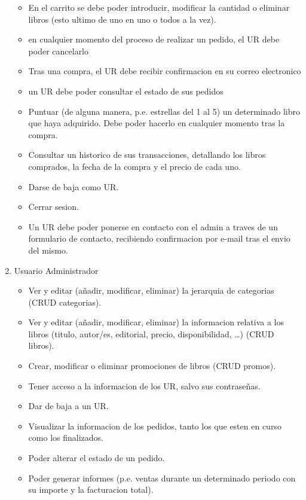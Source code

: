 \documentclass[a4paper]{report}
\begin{document}
\begin{enumerate}
\begin{itemize}
                    \item En el carrito se debe poder introducir, modificar la cantidad o eliminar libros (esto ultimo de uno en uno o todos a la vez).
                    \item en cualquier momento del proceso de realizar un pedido, el UR debe poder cancelarlo
                    \item Tras una compra, el UR debe recibir confirmacion en su correo electronico
                    \item un UR debe poder consultar el estado de sus pedidos
                    \item Puntuar (de alguna manera, p.e. estrellas del 1 al 5) un determinado libro que haya adquirido. Debe poder hacerlo en cualquier momento tras la compra.
                    \item Consultar un historico de sus transacciones, detallando los libros comprados, la fecha de la compra y el precio de cada uno.
                    \item Darse de baja como UR.
                    \item Cerrar sesion.
                    \item Un UR debe poder ponerse en contacto con el admin a traves de un formulario de contacto, recibiendo confirmacion por e-mail tras el envio del mismo.
                \end{itemize}
                \item Usuario Administrador
                \begin{itemize}
                    \item Ver y editar (a\~nadir, modificar, eliminar) la jerarquia de categorias (CRUD categorias).
                    \item Ver y editar (a\~nadir, modificar, eliminar) la informacion relativa a los libros (titulo, autor/es, editorial, precio, disponibilidad, \ldots) (CRUD libros).
                    \item Crear, modificar o eliminar promociones de libros (CRUD promos).
                    \item Tener acceso a la informacion de los UR, salvo sus contrase\~nas.
                    \item Dar de baja a un UR.
                    \item Visualizar la informacion de los pedidos, tanto los que esten en curso como los finalizados.
                    \item Poder alterar el estado de un pedido.
                    \item Poder generar informes (p.e. ventas durante un determinado periodo con su importe y la facturacion total).
                \end{itemize}
            \end{enumerate}
\end{document}
